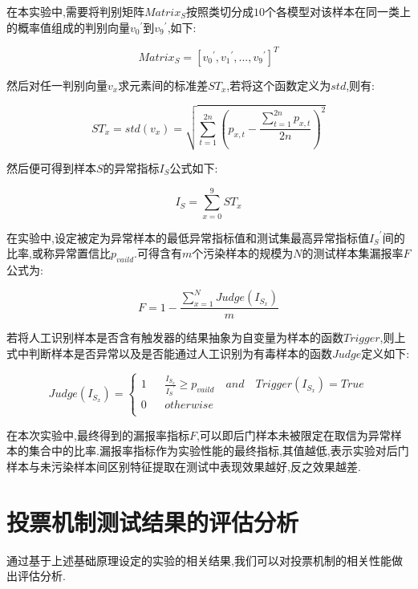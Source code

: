 在本实验中,需要将判别矩阵$Matrix_S$按照类切分成$10$个各模型对该样本在同一类上的概率值组成的判别向量${v_0}^{'}$到${v_9}^{'}$,如下:

\begin{equation}
Matrix_{S} = [{v_0}^{'},{v_1}^{'},...,{v_9}^{'}]^{T} 
\end{equation}

然后对任一判别向量${v_x}$求元素间的标准差${ST}_x$,若将这个函数定义为$std$,则有:

\begin{equation}
{ST}_x=std(v_x)=\sqrt{\sum_{t=1}^{2n} (p_{x,t}-\frac{\sum_{t=1}^{2n} p_{x,t}}{2n})^{2}} 
\end{equation}

然后便可得到样本$S$的异常指标$I_S$公式如下:

\begin{equation}
I_S=\sum_{x=0}^{9} {ST}_x 
\end{equation}

在实验中,设定被定为异常样本的最低异常指标值和测试集最高异常指标值${I_S}^{'}$间的比率,或称异常置信比$p_{vaild}$.可得含有$m$个污染样本的规模为$N$的测试样本集漏报率$F$公式为:

\begin{equation}
F=1-\frac{\sum_{x=1}^{N} Judge(I_{S_x})}{m} 
\end{equation}


若将人工识别样本是否含有触发器的结果抽象为自变量为样本的函数$Trigger$,则上式中判断样本是否异常以及是否能通过人工识别为有毒样本的函数$Judge$定义如下:

\begin{equation}
Judge(I_{S_x})=\left\{
\begin{array}{rcl}
1 && {\frac{I_{S_x}}{{I_S}^{'}} \geq p_{vaild} \quad and \quad Trigger(I_{S_x})=True}\\
0 && {otherwise}\\
\end{array}\right.
\end{equation}

在本次实验中,最终得到的漏报率指标$F$,可以即后门样本未被限定在取信为异常样本的集合中的比率.漏报率指标作为实验性能的最终指标,其值越低,表示实验对后门样本与未污染样本间区别特征提取在测试中表现效果越好,反之效果越差.

\section{投票机制测试结果的评估分析}
通过基于上述基础原理设定的实验的相关结果,我们可以对投票机制的相关性能做出评估分析.

